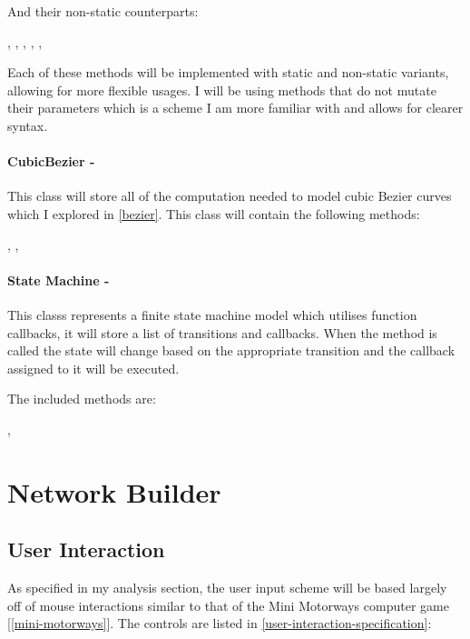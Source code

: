         And their non-static counterparts:

        ,
        ,
        ,
        ,
        ,

        Each of these methods will be implemented with static and non-static variants, allowing for more flexible usages. I will be using methods that do not mutate their parameters which is a scheme I am more familiar with and allows for clearer syntax.

        \paragraph{CubicBezier -}

        This class will store all of the computation needed to model cubic Bezier curves which I explored in \autoref{bezier}.
        This class will contain the following methods:

        , , 

        \paragraph{State Machine -}

        This classs represents a finite state machine model which utilises function callbacks, it will store a list of transitions and callbacks. When the  method is called the state will change based on the appropriate transition and the callback assigned to it will be executed.

        The included methods are:

        , 


\section{Network Builder}

    \subsection{User Interaction}

    As specified in my analysis section, the user input scheme will be based largely off of mouse interactions similar to that of the Mini Motorways computer game [\autoref{mini-motorways}]. The controls are listed in \autoref{user-interaction-specification}:

